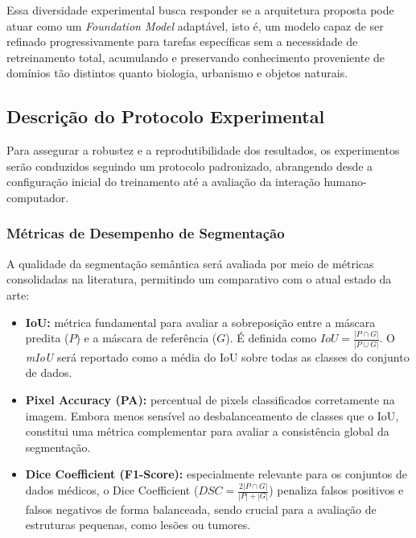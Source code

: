 Essa diversidade experimental busca responder se a arquitetura proposta pode atuar como um \textit{Foundation Model} adaptável, isto é, um modelo capaz de ser refinado progressivamente para tarefas específicas sem a necessidade de retreinamento total, acumulando e preservando conhecimento proveniente de domínios tão distintos quanto biologia, urbanismo e objetos naturais.



\subsection{Descrição do Protocolo Experimental}

Para assegurar a robustez e a reprodutibilidade dos resultados, os experimentos serão conduzidos seguindo um protocolo padronizado, abrangendo desde a configuração inicial do treinamento até a avaliação da interação humano-computador.


\subsubsection{Métricas de Desempenho de Segmentação}


A qualidade da segmentação semântica será avaliada por meio de métricas consolidadas na literatura, permitindo um comparativo com o atual estado da arte:


\begin{itemize}
\item \textbf{\ac{IoU}:} métrica fundamental para avaliar a sobreposição entre a máscara predita ($P$) e a máscara de referência ($G$). É definida como $IoU = \frac{|P \cap G|}{|P \cup G|}$. O \textit{\ac{mIoU}} será reportado como a média do \ac{IoU} sobre todas as classes do conjunto de dados.
\item \textbf{Pixel Accuracy (PA):} percentual de pixels classificados corretamente na imagem. Embora menos sensível ao desbalanceamento de classes que o \ac{IoU}, constitui uma métrica complementar para avaliar a consistência global da segmentação.
\item \textbf{Dice Coefficient (F1-Score):} especialmente relevante para os conjuntos de dados médicos, o Dice Coefficient ($DSC = \frac{2|P \cap G|}{|P| + |G|}$) penaliza falsos positivos e falsos negativos de forma balanceada, sendo crucial para a avaliação de estruturas pequenas, como lesões ou tumores.

\end{itemize}

